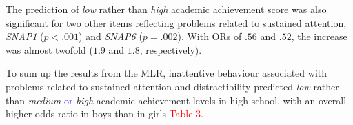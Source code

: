 \documentclass[10pt,letterpaper]{article}
\begin{document}
{{The prediction of {\it low} rather than {\it high} academic achievement score was also significant for two other items reflecting problems related to sustained attention, {\it SNAP1} ($p < .001$) and {\it SNAP6} ($p = .002$). With ORs of $.56$ and $.52$, the increase was almost twofold ($1.9$ and $1.8$, respectively). 





To sum up the results from the MLR, inattentive behaviour associated with problems related to sustained attention and distractibility predicted {\it low} rather than {\it medium}
\textcolor{blue}{or} {\it high} academic achievement levels in high school, with an overall higher odds-ratio in boys than in girls \textcolor{red}{Table 3}. \\



  

\vspace{5mm}

}}
\end{document}
